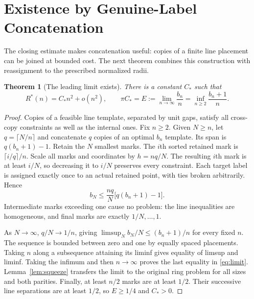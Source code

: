 \documentclass[11pt,letterpaper]{article}
\newtheorem{theorem}{Theorem}
\theoremstyle{definition}\newtheorem{definition}[theorem]{Definition}
\theoremstyle{remark}\newtheorem{remark}[theorem]{Remark}
\newcommand{\Rstar}{R^\ast}
\newcommand{\CC}{C_\ast}
\begin{document}
\section{Existence by Genuine-Label Concatenation}

The closing estimate makes concatenation useful: copies of a finite line
placement can be joined at bounded cost. The next theorem combines this
construction with reassignment to the prescribed normalized radii.

\begin{theorem}[The leading limit exists]\label{thm:existence}
There is a constant $\CC$ such that
\begin{equation}\label{eq:limit}
 \Rstar(n)=\CC n^2+o(n^2),\qquad
 \pi\CC=E:=\lim_{n\to\infty}\frac{b_n}{n}
 =\inf_{n\ge2}\frac{b_n+1}{n}.
\end{equation}
\end{theorem}
\begin{proof}
Copies of a feasible line template, separated by unit gaps, satisfy all
cross-copy constraints as well as the internal ones. Fix $n\ge2$. Given
$N\ge n$, let $q=\lceil N/n\rceil$ and concatenate $q$ copies of an
optimal $b_n$ template. Its span is $q(b_n+1)-1$.
Retain the $N$ smallest marks. The $i$th sorted retained mark is
$\lceil i/q\rceil/n$. Scale all marks and coordinates by $h=nq/N$.
The resulting $i$th mark is at least $i/N$, so decreasing it to $i/N$
preserves every constraint. Each target label is assigned exactly once
to an actual retained point, with ties broken arbitrarily. Hence
\begin{equation}\label{eq:copies}
 b_N\le\frac{nq}{N}\bigl[q(b_n+1)-1\bigr].
\end{equation}
Intermediate marks exceeding one cause no problem: the line inequalities
are homogeneous, and final marks are exactly $1/N,\ldots,1$.

As $N\to\infty$, $q/N\to1/n$, giving
$\limsup_N b_N/N\le(b_n+1)/n$ for every fixed $n$.
The sequence is bounded between zero and one by equally spaced placements.
Taking $n$ along a subsequence attaining its liminf gives equality of
limsup and liminf. Taking the infimum and then $n\to\infty$ proves
the last equality in \eqref{eq:limit}. Lemma~\ref{lem:squeeze} transfers
the limit to the original ring problem for all sizes and both parities.
Finally, at least $n/2$ marks are at least $1/2$. Their successive line
separations are at least $1/2$, so $E\ge1/4$ and $\CC>0$.
\end{proof}
\end{document}
